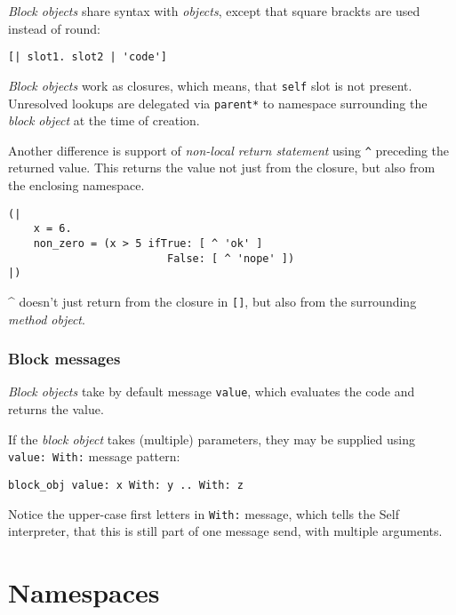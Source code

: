 \documentclass[10pt]{article}
\begin{document}
\begin{multicols*}{3}
\textit{Block objects} share syntax with \textit{objects}, except that square brackts are used instead of round:

\begin{lstlisting}
[| slot1. slot2 | 'code']
\end{lstlisting}

\textit{Block objects} work as closures, which means, that \texttt{self} slot is not present. Unresolved lookups are delegated via \texttt{parent*} to namespace surrounding the \textit{block object} at the time of creation.

Another difference is support of \textit{non-local return statement} using \texttt{\^} preceding the returned value. This returns the value not just from the closure, but also from the enclosing namespace.

\begin{lstlisting}
(|
    x = 6.
    non_zero = (x > 5 ifTrue: [ ^ 'ok' ]
                         False: [ ^ 'nope' ])
|)
\end{lstlisting}

\^{} doesn't just return from the closure in \texttt{[]}, but also from the surrounding \textit{method object}.


\subsubsection{Block messages}

\textit{Block objects} take by default message \texttt{value}, which evaluates the code and returns the value.

If the \textit{block object} takes (multiple) parameters, they may be supplied using \texttt{value:\ With:} message pattern:

\begin{lstlisting}
block_obj value: x With: y .. With: z
\end{lstlisting}

Notice the upper-case first letters in \texttt{With:} message, which tells the Self interpreter, that this is still part of one message send, with multiple arguments.




\pagebreak %
\section{Namespaces}


\end{multicols*}
\end{document}
